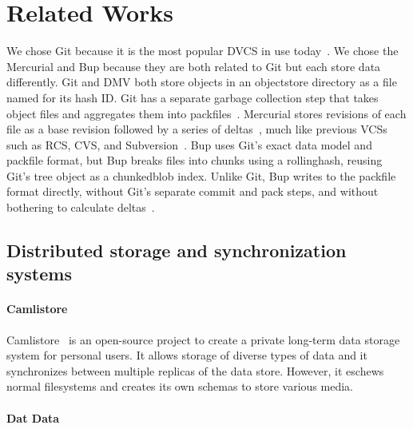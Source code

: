 \section{Related Works}


We chose Git because it is the most popular \gls{DVCS} in use today~\cite{what_are_devs_talking_about}.
We chose the Mercurial and Bup because they are both related to Git but each store data differently.
Git and DMV both store objects in an \gls{objectstore} directory as a file named for its hash ID.
Git has a separate garbage collection step that takes object files and aggregates them into \glspl{packfile}~\cite[Section 10.7]{git_book}.
Mercurial stores revisions of each file as a base revision followed by a series of deltas~\cite[Chapter 4]{hgbook}, much like previous \glspl{VCS} such as RCS, CVS, and Subversion~\cite{history_of_version_control}.
Bup uses Git's exact data model and \gls{packfile} format, but Bup breaks files into chunks using a \gls{rollinghash}, reusing Git's \gls{tree} object as a \gls{chunkedblob} index\footnotemark.
Unlike Git, Bup writes to the \gls{packfile} format directly, without Git's separate commit and pack steps, and without bothering to calculate deltas~\cite{bup_design}.



\subsection{Distributed storage and synchronization systems}

\paragraph{Camlistore}

Camlistore~\cite{camlistore_homepage} is an open-source project to create a private long-term data storage system for personal users.
It allows storage of diverse types of data and it synchronizes between multiple replicas of the data store.
However, it eschews normal filesystems and creates its own schemas to store various media.


\paragraph{Dat Data}

